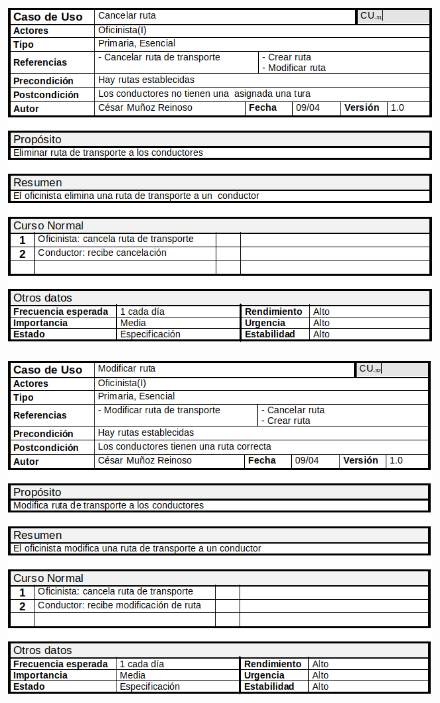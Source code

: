 \begin{figure}[H]
	\centering
	\includegraphics[width=16cm]{9}
\end{figure}
\begin{figure}[H]
	\centering
	\includegraphics[width=16cm]{10}
\end{figure}

